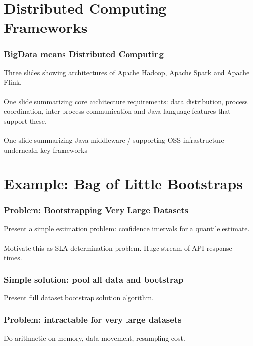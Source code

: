 \documentclass[14pt,mathserif]{beamer}
\begin{document}
\section[History]{Distributed Computing Frameworks}

\begin{frame}
  \frametitle{BigData means Distributed Computing}
Three slides showing architectures of Apache Hadoop, Apache Spark and Apache Flink.
\\
\\
One slide summarizing core architecture requirements: data distribution, process coordination, inter-process communication and Java language features that support these.
\\
\\
One slide summarizing Java middleware / supporting OSS infrastructure underneath key frameworks

\end{frame}

\section[History]{Example: Bag of Little Bootstraps}

\begin{frame}
  \frametitle{Problem: Bootstrapping Very Large Datasets}
Present a simple estimation problem: confidence intervals for a quantile estimate.  
\\
\\
Motivate this as SLA determination problem. Huge stream of API response times.
\end{frame}

\begin{frame}
\frametitle{Simple solution: pool all data and bootstrap}
Present full dataset bootstrap solution algorithm.
\end{frame}

\begin{frame}
\frametitle{Problem: intractable for very large datasets}
Do arithmetic on memory, data movement, resampling cost.
\end{frame}
\end{document}
